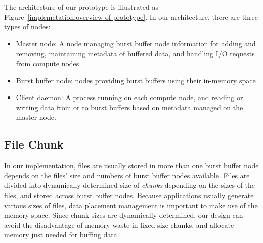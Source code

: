 The architecture of our prototype is illustrated as
Figure~\ref{implemetation:overview of prototype}.
In our architecture, there are three
types of nodes:
\begin{itemize}
	\item Master node: A node managing burst buffer node information for adding and
	removing, maintaining metadata of buffered data, and handling I/O requests
	from compute nodes
	\item Burst buffer node: nodes providing burst buffers using their
	in-memory space
	\item Client daemon: A process running on each compute node, and
	reading or writing data from or to burst buffers based on metadata managed on
	the master node.
\end{itemize}

\subsection{File Chunk}
In our implementation, files are usually stored in more than one burst buffer node depends on the files'
size and numbers of burst buffer nodes available.
Files are divided into dynamically determined-size of \emph{chunks} depending
on the sizes of the files, and stored across burst buffer nodes.
Because applications usually generate various sizes of files, data placement
management is important to make use of the memory space.
Since chunk sizes are dynamically determined, our design can avoid
the disadvantage of memory waste in fixed-size chunks, and allocate
memory just needed for buffing data.

